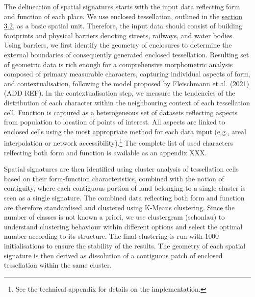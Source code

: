 

The delineation of spatial signatures starts with the input data reflecting form
and function of each place. We use enclosed tessellation, outlined in the
\hyperref[sec:ssec:ss_et]{section 3.2}, as a basic spatial unit. Therefore, the
input data should consist of building footprints and
physical barriers denoting streets, railways, and water bodies.
Using barriers, we first identify the geometry of enclosures to determine the
external boundaries of consequently generated enclosed tessellation.
Resulting set of geometric data is rich enough for a comprehensive morphometric analysis
composed of primary measurable characters, capturing individual aspects of form,
and contextualisation, following the model proposed by Fleischmann et al. (2021)
(ADD REF).
In the contextualisation step, we measure the tendencies of the distribution of
each character within the neighbouring context of each tessellation cell.
Function is captured as a heterogeneous set of datasets reflecting aspects from
population to location of points of interest. All aspects are linked to enclosed
cells using the most appropriate method for each data input (e.g., areal
interpolation or network accessibility).\footnote{See the technical appendix for
details on the implementation.} The complete list of used characters relfecting
both form and function is available as an appendix XXX.


Spatial signatures are then identified using cluster analysis of tessellation
cells based on their form-function characteristics, combined with the
notion of contiguity, where each contiguous portion of land belonging to a
single cluster is seen as a single signature.
The combined data reflecting both form and function are therefore standardised
and clustered using K-Means clustering. Since the number of classes is not known
a priori, we use clustergram (schonlau) to understand clustering behaviour
within different options and select the optimal number according to its
structure.
The final clustering is run with 1000 initialisations to ensure the stability of
the results.
The geometry of each spatial signature is then derived as dissolution of a
contiguous patch of enclosed tessellation within the same cluster.


